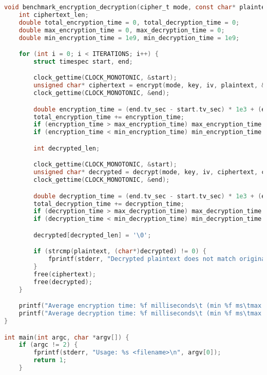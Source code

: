 \documentclass{article}
\begin{document}
\begin{lstlisting}[language=C]
void benchmark_encryption_decryption(cipher_t mode, const char* plaintext, int plaintext_len, const unsigned char* key, const unsigned char* iv) {
    int ciphertext_len;
    double total_encryption_time = 0, total_decryption_time = 0;
    double max_encryption_time = 0, max_decryption_time = 0;
    double min_encryption_time = 1e9, min_decryption_time = 1e9;

    for (int i = 0; i < ITERATIONS; i++) {
        struct timespec start, end;

        clock_gettime(CLOCK_MONOTONIC, &start);
        unsigned char* ciphertext = encrypt(mode, key, iv, plaintext, &ciphertext_len);
        clock_gettime(CLOCK_MONOTONIC, &end);

        double encryption_time = (end.tv_sec - start.tv_sec) * 1e3 + (end.tv_nsec - start.tv_nsec) / 1e6;
        total_encryption_time += encryption_time;
        if (encryption_time > max_encryption_time) max_encryption_time = encryption_time;
        if (encryption_time < min_encryption_time) min_encryption_time = encryption_time;

        int decrypted_len;

        clock_gettime(CLOCK_MONOTONIC, &start);
        unsigned char* decrypted = decrypt(mode, key, iv, ciphertext, ciphertext_len, &decrypted_len);
        clock_gettime(CLOCK_MONOTONIC, &end);

        double decryption_time = (end.tv_sec - start.tv_sec) * 1e3 + (end.tv_nsec - start.tv_nsec) / 1e6;
        total_decryption_time += decryption_time;
        if (decryption_time > max_decryption_time) max_decryption_time = decryption_time;
        if (decryption_time < min_decryption_time) min_decryption_time = decryption_time;

        decrypted[decrypted_len] = '\0';

        if (strcmp(plaintext, (char*)decrypted) != 0) {
            fprintf(stderr, "Decrypted plaintext does not match original plaintext\n");
        }
        free(ciphertext);
        free(decrypted);
    }

    printf("Average encryption time: %f milliseconds\t (min %f ms\tmax %f ms)\n", total_encryption_time / ITERATIONS, min_encryption_time, max_encryption_time);
    printf("Average decryption time: %f milliseconds\t (min %f ms\tmax %f ms)\n", total_decryption_time / ITERATIONS, min_decryption_time, max_decryption_time);
}

int main(int argc, char *argv[]) {
    if (argc != 2) {
        fprintf(stderr, "Usage: %s <filename>\n", argv[0]);
        return 1;
    }


\end{lstlisting}
\end{document}

